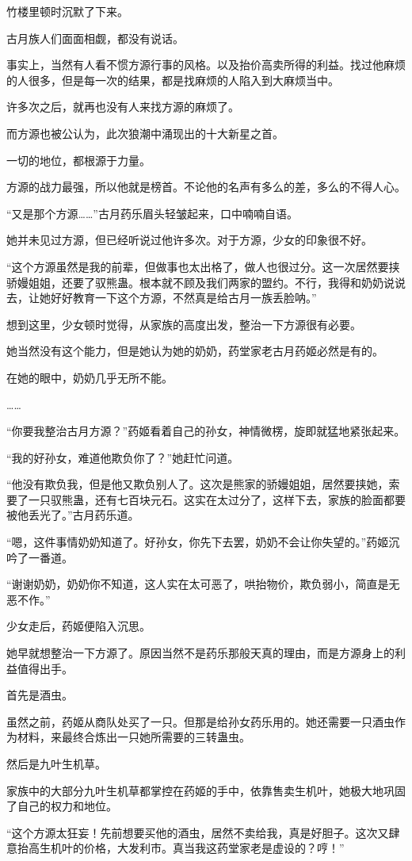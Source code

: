\begin{this_body}
竹楼里顿时沉默了下来。

古月族人们面面相觑，都没有说话。

事实上，当然有人看不惯方源行事的风格。以及抬价高卖所得的利益。找过他麻烦的人很多，但是每一次的结果，都是找麻烦的人陷入到大麻烦当中。

许多次之后，就再也没有人来找方源的麻烦了。

而方源也被公认为，此次狼潮中涌现出的十大新星之首。

一切的地位，都根源于力量。

方源的战力最强，所以他就是榜首。不论他的名声有多么的差，多么的不得人心。

“又是那个方源……”古月药乐眉头轻皱起来，口中喃喃自语。

她并未见过方源，但已经听说过他许多次。对于方源，少女的印象很不好。

“这个方源虽然是我的前辈，但做事也太出格了，做人也很过分。这一次居然要挟骄嫚姐姐，还要了驭熊蛊。根本就不顾及我们两家的盟约。不行，我得和奶奶说说去，让她好好教育一下这个方源，不然真是给古月一族丢脸呐。”

想到这里，少女顿时觉得，从家族的高度出发，整治一下方源很有必要。

她当然没有这个能力，但是她认为她的奶奶，药堂家老古月药姬必然是有的。

在她的眼中，奶奶几乎无所不能。

……

“你要我整治古月方源？”药姬看着自己的孙女，神情微楞，旋即就猛地紧张起来。

“我的好孙女，难道他欺负你了？”她赶忙问道。

“他没有欺负我，但是他又欺负别人了。这次是熊家的骄嫚姐姐，居然要挟她，索要了一只驭熊蛊，还有七百块元石。这实在太过分了，这样下去，家族的脸面都要被他丢光了。”古月药乐道。

“嗯，这件事情奶奶知道了。好孙女，你先下去罢，奶奶不会让你失望的。”药姬沉吟了一番道。

“谢谢奶奶，奶奶你不知道，这人实在太可恶了，哄抬物价，欺负弱小，简直是无恶不作。”

少女走后，药姬便陷入沉思。

她早就想整治一下方源了。原因当然不是药乐那般天真的理由，而是方源身上的利益值得出手。

首先是酒虫。

虽然之前，药姬从商队处买了一只。但那是给孙女药乐用的。她还需要一只酒虫作为材料，来最终合炼出一只她所需要的三转蛊虫。

然后是九叶生机草。

家族中的大部分九叶生机草都掌控在药姬的手中，依靠售卖生机叶，她极大地巩固了自己的权力和地位。

“这个方源太狂妄！先前想要买他的酒虫，居然不卖给我，真是好胆子。这次又肆意抬高生机叶的价格，大发利市。真当我这药堂家老是虚设的？哼！”

\end{this_body}

